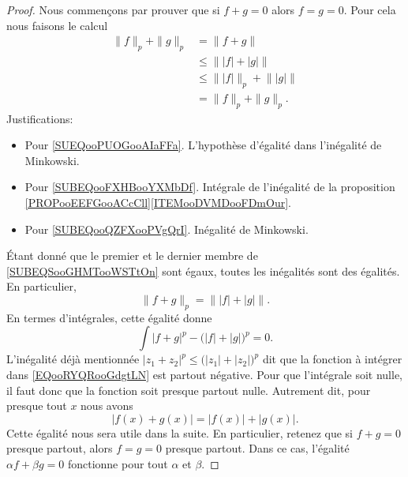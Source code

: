 \begin{proof}
	Nous commençons par prouver que si \( f+g=0\) alors \( f=g=0\). Pour cela nous faisons le calcul
	\begin{subequations}		\label{SUBEQSooGHMTooWSTtOn}
		\begin{align}
			\| f \|_p+\| g \|_p & =\| f+g \|		\label{SUEQooPUOGooAIaFFa}                                       \\
			                    & \leq \big\| | f |+| g |  \big\|		\label{SUBEQooFXHBooYXMbDf}                 \\
			                    & \leq \big\| | f |  \big\|_p+\big\|  | g | \big\|	\label{SUBEQooQZFXooPVgQrI} \\
			                    & = \| f \|_p+\| g \|_p.
		\end{align}
	\end{subequations}
	Justifications:
	\begin{itemize}
		\item
		      Pour \eqref{SUEQooPUOGooAIaFFa}. L'hypothèse d'égalité dans l'inégalité de Minkowski.
		\item
		      Pour \eqref{SUBEQooFXHBooYXMbDf}. Intégrale de l'inégalité de la proposition \ref{PROPooEEFGooACcCll}\ref{ITEMooDVMDooFDmOur}.
		\item
		      Pour \eqref{SUBEQooQZFXooPVgQrI}. Inégalité de Minkowski.
	\end{itemize}
	Étant donné que le premier et le dernier membre de \eqref{SUBEQSooGHMTooWSTtOn} sont égaux, toutes les inégalités sont des égalités. En particulier,
	\begin{equation}
		\| f+g \|_p=\big\| | f |+| g |  \big\|.
	\end{equation}
	En termes d'intégrales, cette égalité donne
	\begin{equation}		\label{EQooRYQRooGdgtLN}
		\int| f+g |^p-\big( | f |+| g | \big)^p=0.
	\end{equation}
	L'inégalité déjà mentionnée \( | z_1+z_2 |^p\leq \big( | z_1 |+| z_2 | \big)^p\) dit que la fonction à intégrer dans \eqref{EQooRYQRooGdgtLN} est partout négative. Pour que l'intégrale soit nulle, il faut donc que la fonction soit presque partout nulle. Autrement dit, pour presque tout \( x\) nous avons
	\begin{equation}		\label{EQooULHAooWXViEH}
		| f(x)+g(x) |=| f(x) |+| g(x) |.
	\end{equation}
	Cette égalité nous sera utile dans la suite. En particulier, retenez que si \( f+g=0\) presque partout, alors \( f=g=0\) presque partout. Dans ce cas, l'égalité \( \alpha f+\beta g=0\) fonctionne pour tout \( \alpha\) et \( \beta\).


\end{proof}
